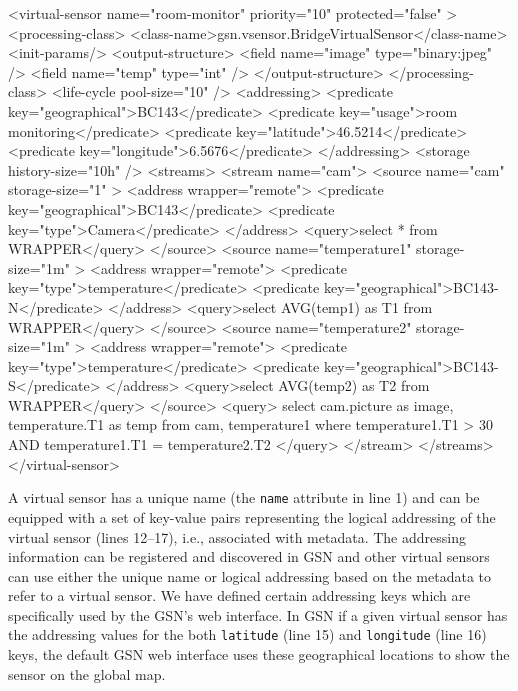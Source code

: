\begin{xmlcode}[caption={A virtual sensor definition}, label=fig:ComplexVS]

<virtual-sensor name="room-monitor" priority="10" 
         protected="false" >
  <processing-class>
     <class-name>gsn.vsensor.BridgeVirtualSensor</class-name>
     <init-params/>
     <output-structure>
        <field name="image" type="binary:jpeg" />
        <field name="temp"  type="int" />
     </output-structure>
  </processing-class>
  <life-cycle pool-size="10" />
  <addressing>
      <predicate key="geographical">BC143</predicate>
      <predicate key="usage">room monitoring</predicate>
      <predicate key="latitude">46.5214</predicate>
      <predicate key="longitude">6.5676</predicate>
  </addressing>
  <storage history-size="10h" />
  <streams>
      <stream name="cam">
         <source name="cam"  storage-size="1" >
            <address wrapper="remote">
               <predicate key="geographical">BC143</predicate>
               <predicate key="type">Camera</predicate>
            </address>
            <query>select * from WRAPPER</query>
         </source>
         <source name="temperature1" storage-size="1m" >
            <address wrapper="remote">
               <predicate key="type">temperature</predicate>
               <predicate key="geographical">BC143-N</predicate>
            </address>
            <query>select AVG(temp1) as T1 from WRAPPER</query>
         </source>
         <source name="temperature2"  storage-size="1m" >
            <address wrapper="remote">
               <predicate key="type">temperature</predicate>
               <predicate key="geographical">BC143-S</predicate>
            </address>
            <query>select AVG(temp2) as T2 from WRAPPER</query>
         </source>
         <query>
            select cam.picture as image, temperature.T1 as temp
            from   cam, temperature1
            where  temperature1.T1 > 30 AND
                   temperature1.T1 = temperature2.T2
         </query>
      </stream>
   </streams>
</virtual-sensor>
\end{xmlcode}

A virtual sensor has a unique name (the \verb|name| attribute in line 1) and
can be equipped with a set of key-value pairs representing the logical addressing of the
virtual sensor (lines 12--17), i.e., associated with metadata. The addressing information can be registered and
discovered in GSN and other virtual sensors can use either the unique name or
logical addressing based on the metadata to refer to a virtual sensor. 
We have defined certain addressing keys which are specifically used by the GSN's web interface. In GSN if a given
virtual sensor has the addressing values for the both \texttt{latitude} (line 15) and \texttt{longitude} (line 16) keys, the default GSN
web interface uses these geographical locations to show the sensor on the global map.

